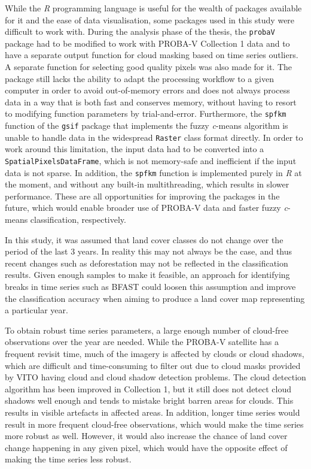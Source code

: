 \documentclass[a4paper,12pt]{scrbook}
\begin{document}
While the \textit{R} programming language is useful for the wealth of packages available for it and the ease of data visualisation, some packages used in this study were difficult to work with. During the analysis phase of the thesis, the \texttt{probaV} package had to be modified to work with PROBA-V Collection 1 data and to have a separate output function for cloud masking based on time series outliers. A separate function for selecting good quality pixels was also made for it. The package still lacks the ability to adapt the processing workflow to a given computer in order to avoid out-of-memory errors and does not always process data in a way that is both fast and conserves memory, without having to resort to modifying function parameters by trial-and-error. Furthermore, the \texttt{spfkm} function of the \texttt{gsif} package that implements the fuzzy \textit{c}-means algorithm is unable to handle data in the widespread \texttt{Raster} class format directly. In order to work around this limitation, the input data had to be converted into a \texttt{SpatialPixelsDataFrame}, which is not memory-safe and inefficient if the input data is not sparse. In addition, the \texttt{spfkm} function is implemented purely in \textit{R} at the moment, and without any built-in multithreading, which results in slower performance. These are all opportunities for improving the packages in the future, which would enable broader use of PROBA-V data and faster fuzzy \textit{c}-means classification, respectively.

In this study, it was assumed that land cover classes do not change over the period of the last 3 years. In reality this may not always be the case, and thus recent changes such as deforestation may not be reflected in the classification results. Given enough samples to make it feasible, an approach for identifying breaks in time series such as BFAST \citep{Verbesselt2010bfast} could loosen this assumption and improve the classification accuracy when aiming to produce a land cover map representing a particular year.

To obtain robust time series parameters, a large enough number of cloud-free observations over the year are needed. While the PROBA-V satellite has a frequent revisit time, much of the imagery is affected by clouds or cloud shadows, which are difficult and time-consuming to filter out due to cloud masks provided by VITO having cloud and cloud shadow detection problems. The cloud detection algorithm has been improved in Collection 1, but it still does not detect cloud shadows well enough and tends to mistake bright barren areas for clouds. This results in visible artefacts in affected areas. In addition, longer time series would result in more frequent cloud-free observations, which would make the time series more robust as well. However, it would also increase the chance of land cover change happening in any given pixel, which would have the opposite effect of making the time series less robust.
\end{document}
